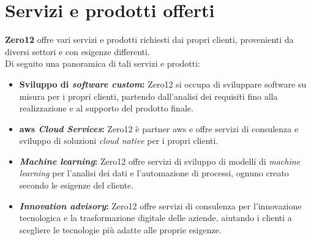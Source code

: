 \section{Servizi e prodotti offerti}
\label{sez:servizi-prodotti-offerti}

\textbf{Zero12} offre vari servizi e prodotti richiesti dai propri clienti, provenienti da diversi settori e con esigenze differenti.\\
Di seguito una panoramica di tali servizi e prodotti:

\begin{itemize}
    \item \textbf{Sviluppo di \textit{software custom}:} Zero12 si occupa di sviluppare software su misura per i propri clienti, partendo dall'analisi dei requisiti fino alla realizzazione e al supporto del prodotto finale.\\
    \item \textbf{\gls{aws} \textit{Cloud Services}:} Zero12 è partner \gls{aws} e offre servizi di consulenza e sviluppo di soluzioni \textit{cloud native} per i propri clienti.\\
    \item \textbf{\textit{Machine learning}:} Zero12 offre servizi di sviluppo di modelli di \textit{machine learning} per l'analisi dei dati e l'automazione di processi, ognuno creato secondo le esigenze del cliente.\\
    \item \textbf{\textit{Innovation advisory}:} Zero12 offre servizi di consulenza per l'innovazione tecnologica e la trasformazione digitale delle aziende, aiutando i clienti a scegliere le tecnologie più adatte alle proprie esigenze.\\
\end{itemize}